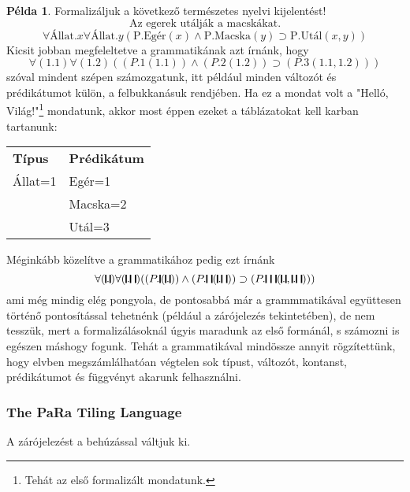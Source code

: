 \documentclass[a4paper]{article}
\newcommand{\stick}{\rule[-.2ex]{.12em}{1.8ex}}
\theoremstyle{definition}
\newtheorem{pelda}{Példa}[section]
\begin{document}
{

\begin{pelda}
Formalizáljuk a következő természetes nyelvi kijelentést!
$$
\text{Az egerek utálják a macskákat.}
$$
$$\forall \text{Állat.}x \forall \text{Állat.}y ( \text{P.Egér}(x) \wedge \text{P.Macska}(y)  \supset \text{P.Utál}(x, y))$$
Kicsit jobban megfeleltetve a grammatikának azt írnánk, hogy
$$\forall (1.1) \forall (1.2) ( 
(P.1 (1.1)) \wedge (P.2 (1.2))  
\supset 
(P.3(1.1, 1.2))
)$$
szóval mindent szépen számozgatunk, itt például minden változót és prédikátumot külön, a felbukkanásuk rendjében. Ha ez a mondat volt a "Helló, Világ!"\footnote{Tehát az els\H o formalizált mondatunk.} mondatunk, akkor most éppen ezeket a táblázatokat kell karban tartanunk:

\begin{center}
\begin{tabular}{ll}
\centering
\textbf{Típus} & \textbf{Prédikátum}\\
Állat=1& Egér=1\\
& Macska=2\\
& Utál=3
\end{tabular}
\end{center}

Méginkább közelítve a grammatikához pedig ezt írnánk
$$\forall (\stick . \stick) \forall (\stick . \stick \ \stick) ( 
(P . \stick (\stick . \stick)) \wedge (P . \stick \ \stick (\stick . \stick \ \stick))  
\supset 
(P . \stick \ \stick \ \stick(\stick . \stick, \stick . \stick \ \stick))
)$$
ami még mindig elég pongyola, de pontosabbá már a grammmatikával együttesen 
történ\H o pontosítással tehetnénk (például a zárójelezés tekintetében), de nem tesszük, mert a formalizálásoknál úgyis maradunk az els\H o formánál, s számozni is egészen máshogy fogunk. Tehát a grammatikával mindössze annyit rögzítettünk, hogy elvben megszámlálhatóan végtelen sok típust, változót, kontanst, prédikátumot és függvényt akarunk felhasználni. 
\end{pelda}
}

\subsubsection{The PaRa Tiling Language}

A zárójelezést a behúzással váltjuk ki.
\end{document}
